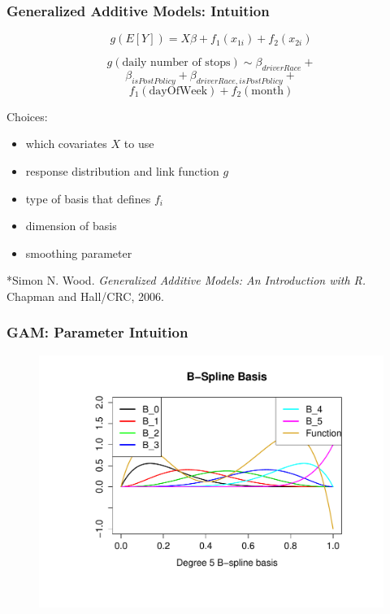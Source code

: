 \documentclass{beamer}
\begin{document}
\begin{frame}


\frametitle{Generalized Additive Models: Intuition}

$$ g(E[Y]) = X\beta + f_1(x_{1i})+f_2(x_{2i})$$

$$g(\text{daily number of stops}) \sim \beta_{driverRace} + $$
$$\beta_{isPostPolicy}+ \beta_{driverRace, isPostPolicy}+$$
$$ f_1(\text{dayOfWeek}) + f_2(\text{month}) $$


Choices: 
\begin{itemize}
\item which covariates $X$ to use
\item response distribution and link function $g$
\item type of basis that defines $f_i$
\item dimension of basis
\item smoothing parameter
\end{itemize}

\footnotesize{*Simon N. Wood. \textit{Generalized Additive Models: An Introduction with R.} Chapman and Hall/CRC, 2006.}
\end{frame}

\begin{frame}
\frametitle{GAM: Parameter Intuition}
\begin{figure}
\includegraphics[scale=.4]{figures/bSplineBasis}
\end{figure}

\end{frame}
\end{document}
